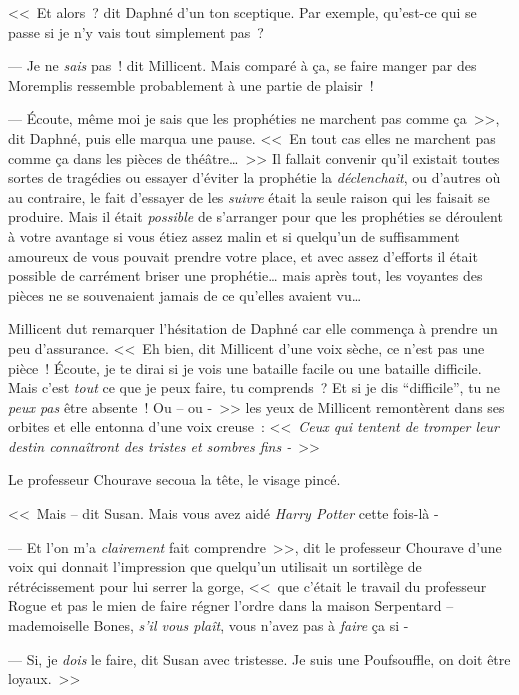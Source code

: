 <<~Et alors~? dit Daphné d'un ton sceptique. Par exemple, qu'est-ce qui se passe si je n'y vais tout simplement pas~?

--- Je ne \emph{sais} pas~! dit Millicent. Mais comparé à ça, se faire manger par des Moremplis ressemble probablement à une partie de plaisir~!

--- Écoute, même moi je sais que les prophéties ne marchent pas comme ça~>>, dit Daphné, puis elle marqua une pause. <<~En tout cas elles ne marchent pas comme ça dans les pièces de théâtre…~>> Il fallait convenir qu'il existait toutes sortes de tragédies ou essayer d'éviter la prophétie la \emph{déclenchait}, ou d'autres où au contraire, le fait d'essayer de les \emph{suivre} était la seule raison qui les faisait se produire. Mais il était \emph{possible} de s'arranger pour que les prophéties se déroulent à votre avantage si vous étiez assez malin et si quelqu'un de suffisamment amoureux de vous pouvait prendre votre place, et avec assez d'efforts il était possible de carrément briser une prophétie… mais après tout, les voyantes des pièces ne se souvenaient jamais de ce qu'elles avaient vu…

Millicent dut remarquer l'hésitation de Daphné car elle commença à prendre un peu d'assurance. <<~Eh bien, dit Millicent d'une voix sèche, ce n'est pas une pièce~! Écoute, je te dirai si je vois une bataille facile ou une bataille difficile. Mais c'est \emph{tout} ce que je peux faire, tu comprends~? Et si je dis “difficile”, tu ne \emph{peux pas} être absente~! Ou -- ou -~>> les yeux de Millicent remontèrent dans ses orbites et elle entonna d'une voix creuse~: <<~\emph{Ceux qui tentent de tromper leur destin connaîtront des tristes et sombres fins -}~>>

\later

Le professeur Chourave secoua la tête, le visage pincé.

<<~Mais -- dit Susan. Mais vous avez aidé \emph{Harry Potter} cette fois-là -

--- Et l'on m'a \emph{clairement} fait comprendre~>>, dit le professeur Chourave d'une voix qui donnait l'impression que quelqu'un utilisait un sortilège de rétrécissement pour lui serrer la gorge, <<~que c'était le travail du professeur Rogue et pas le mien de faire régner l'ordre dans la maison Serpentard -- mademoiselle Bones, \emph{s'il vous plaît}, vous n'avez pas à \emph{faire} ça si -

--- Si, je \emph{dois} le faire, dit Susan avec tristesse. Je suis une Poufsouffle, on doit être loyaux.~>>

